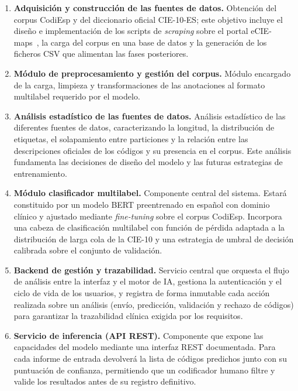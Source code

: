 \begin{enumerate}

 \item \textbf{Adquisición y construcción de las fuentes de datos.} Obtención del corpus CodiEsp y del diccionario oficial CIE-10-ES; este objetivo incluye el diseño e implementación de los scripts de \emph{scraping} sobre el portal eCIE-maps~\cite{eciemaps2024}, la carga del corpus en una base de datos y la generación de los ficheros CSV que alimentan las fases posteriores.

 \item \textbf{Módulo de preprocesamiento y gestión del corpus.} Módulo encargado de la carga, limpieza y transformaciones de las anotaciones al formato multilabel requerido por el modelo.

 \item \textbf{Análisis estadístico de las fuentes de datos.} Análisis estadístico de las diferentes fuentes de datos, caracterizando la longitud, la distribución de etiquetas, el solapamiento entre particiones y la relación entre las descripciones oficiales de los códigos y su presencia en el corpus. Este análisis fundamenta las decisiones de diseño del modelo y las futuras estrategias de entrenamiento.

 \item \textbf{Módulo clasificador multilabel.} Componente central del sistema. Estará constituido por un modelo BERT preentrenado en español con dominio clínico y ajustado mediante \emph{fine-tuning} sobre el corpus CodiEsp. Incorpora una cabeza de clasificación multilabel con función de pérdida adaptada a la distribución de larga cola de la CIE-10 y una estrategia de umbral de decisión calibrada sobre el conjunto de validación.

 \item \textbf{Backend de gestión y trazabilidad.} Servicio central que orquesta el flujo de análisis entre la interfaz y el motor de IA, gestiona la autenticación y el ciclo de vida de los usuarios, y registra de forma inmutable cada acción realizada sobre un análisis (envío, predicción, validación y rechazo de códigos) para garantizar la trazabilidad clínica exigida por los requisitos.

 \item \textbf{Servicio de inferencia (API REST).} Componente que expone las capacidades del modelo mediante una interfaz REST documentada. Para cada informe de entrada devolverá la lista de códigos predichos junto con su puntuación de confianza, permitiendo que un codificador humano filtre y valide los resultados antes de su registro definitivo.


\end{enumerate}
